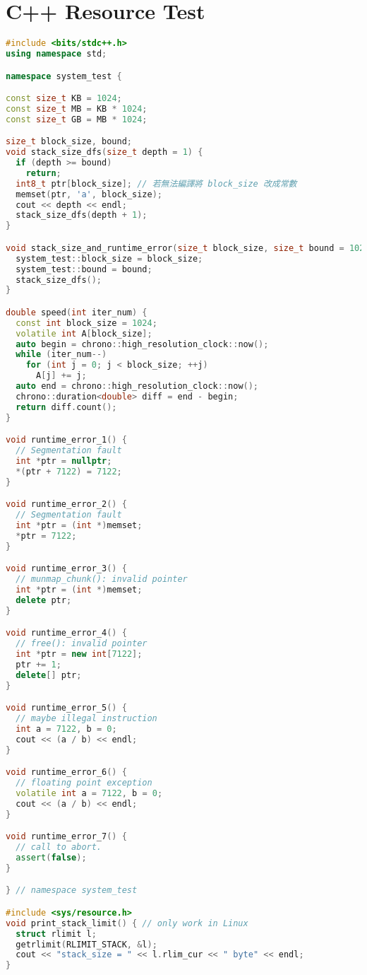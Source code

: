 \section*{C++ Resource Test} %

\begin{lstlisting}[language=C++]
#include <bits/stdc++.h>
using namespace std;

namespace system_test {

const size_t KB = 1024;
const size_t MB = KB * 1024;
const size_t GB = MB * 1024;

size_t block_size, bound;
void stack_size_dfs(size_t depth = 1) {
  if (depth >= bound)
    return;
  int8_t ptr[block_size]; // 若無法編譯將 block_size 改成常數
  memset(ptr, 'a', block_size);
  cout << depth << endl;
  stack_size_dfs(depth + 1);
}

void stack_size_and_runtime_error(size_t block_size, size_t bound = 1024) {
  system_test::block_size = block_size;
  system_test::bound = bound;
  stack_size_dfs();
}

double speed(int iter_num) {
  const int block_size = 1024;
  volatile int A[block_size];
  auto begin = chrono::high_resolution_clock::now();
  while (iter_num--)
    for (int j = 0; j < block_size; ++j)
      A[j] += j;
  auto end = chrono::high_resolution_clock::now();
  chrono::duration<double> diff = end - begin;
  return diff.count();
}

void runtime_error_1() {
  // Segmentation fault
  int *ptr = nullptr;
  *(ptr + 7122) = 7122;
}

void runtime_error_2() {
  // Segmentation fault
  int *ptr = (int *)memset;
  *ptr = 7122;
}

void runtime_error_3() {
  // munmap_chunk(): invalid pointer
  int *ptr = (int *)memset;
  delete ptr;
}

void runtime_error_4() {
  // free(): invalid pointer
  int *ptr = new int[7122];
  ptr += 1;
  delete[] ptr;
}

void runtime_error_5() {
  // maybe illegal instruction
  int a = 7122, b = 0;
  cout << (a / b) << endl;
}

void runtime_error_6() {
  // floating point exception
  volatile int a = 7122, b = 0;
  cout << (a / b) << endl;
}

void runtime_error_7() {
  // call to abort.
  assert(false);
}

} // namespace system_test

#include <sys/resource.h>
void print_stack_limit() { // only work in Linux
  struct rlimit l;
  getrlimit(RLIMIT_STACK, &l);
  cout << "stack_size = " << l.rlim_cur << " byte" << endl;
}
\end{lstlisting}